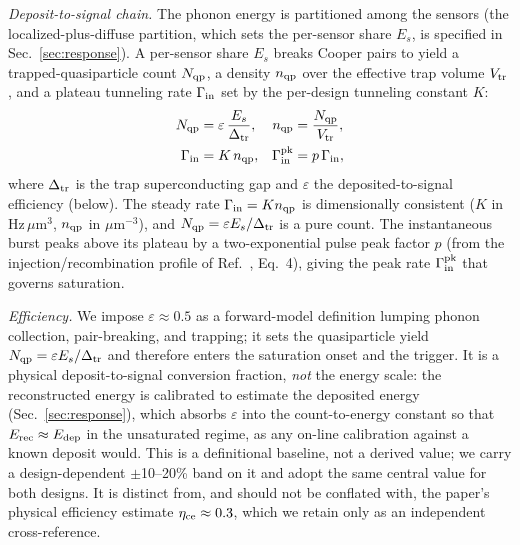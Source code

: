 \emph{Deposit-to-signal chain.} The phonon energy is partitioned among the sensors (the localized-plus-diffuse partition, which sets the per-sensor share $E_s$, is specified in Sec.~\ref{sec:response}). A per-sensor share $E_s$ breaks Cooper pairs to yield a trapped-quasiparticle count $N_{\rm qp}$, a density $n_{\rm qp}$ over the effective trap volume $V_{\rm tr}$, and a plateau tunneling rate $\Gamma_{\rm in}$ set by the per-design tunneling constant $K$:
\begin{align}
N_{\rm qp} &= \varepsilon\,\frac{E_s}{\Delta_{\rm tr}}, &
n_{\rm qp} &= \frac{N_{\rm qp}}{V_{\rm tr}}, \nonumber\\
\Gamma_{\rm in} &= K\,n_{\rm qp}, &
\Gamma_{\rm in}^{\rm pk} &= p\,\Gamma_{\rm in},
\label{eq:chain}
\end{align}
where $\Delta_{\rm tr}$ is the trap superconducting gap and $\varepsilon$ the deposited-to-signal efficiency (below). The steady rate $\Gamma_{\rm in} = K n_{\rm qp}$ is dimensionally consistent ($K$ in Hz\,$\mu$m$^3$, $n_{\rm qp}$ in $\mu$m$^{-3}$), and $N_{\rm qp}=\varepsilon E_s/\Delta_{\rm tr}$ is a pure count. The instantaneous burst peaks above its plateau by a two-exponential pulse peak factor $p$ (from the injection/recombination profile of Ref.~\cite{ramanathan2026}, Eq.~4), giving the peak rate $\Gamma_{\rm in}^{\rm pk}$ that governs saturation.

\emph{Efficiency.} We impose $\varepsilon \approx 0.5$ as a forward-model definition lumping phonon collection, pair-breaking, and trapping; it sets the quasiparticle yield $N_{\rm qp}=\varepsilon E_s/\Delta_{\rm tr}$ and therefore enters the saturation onset and the trigger. It is a physical deposit-to-signal conversion fraction, \emph{not} the energy scale: the reconstructed energy is calibrated to estimate the deposited energy (Sec.~\ref{sec:response}), which absorbs $\varepsilon$ into the count-to-energy constant so that $E_{\rm rec}\approx E_{\rm dep}$ in the unsaturated regime, as any on-line calibration against a known deposit would. This is a definitional baseline, not a derived value; we carry a design-dependent $\pm$10--20\% band on it and adopt the same central value for both designs. It is distinct from, and should not be conflated with, the paper's physical efficiency estimate $\eta_{\rm ce}\approx 0.3$, which we retain only as an independent cross-reference.

